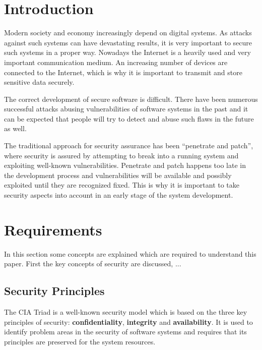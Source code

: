 \documentclass{acmtog} %
\begin{document}
\section{Introduction}

Modern society and economy increasingly depend on digital systems.
As attacks against such systems can have devastating results, it is very important to secure such systems in a proper way.
Nowadays the Internet is a heavily used and very important communication medium.
An increasing number of devices are connected to the Internet, which is why it is important to transmit and store sensitive data securely.

The correct development of secure software is difficult.
There have been numerous successful attacks abusing vulnerabilities of software systems in the past and it can be expected that people will try to detect and abuse such flaws in the future as well.

The traditional approach for security assurance has been ``penetrate and patch'', where security is assured by attempting to break into a running system and exploiting well-known vulnerabilities.
Penetrate and patch happens too late in the development process and vulnerabilities will be available and possibly exploited  until they are recognized fixed.
This is why it is important to take security aspects into account in an early stage of the system development.


\section{Requirements}
\label{sec:requirements}

In this section some concepts are explained which are required to understand this paper.
First the key concepts of security are discussed, ...

\subsection{Security Principles}

The CIA Triad is a well-known security model which is based on the three key principles of security: \textbf{confidentiality}, \textbf{integrity} and \textbf{availability}.
It is used to identify problem areas in the security of software systems and requires that its principles are preserved for the system resources.
\end{document}
